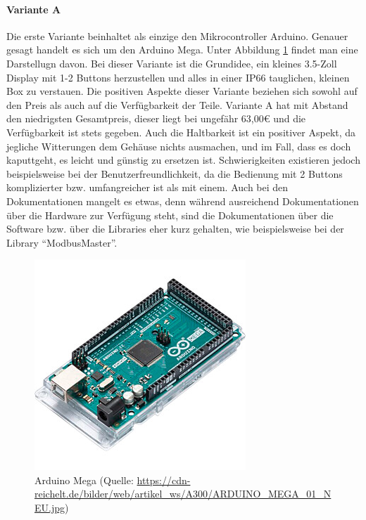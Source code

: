 \paragraph{Variante A}
Die erste Variante beinhaltet als einzige den Mikrocontroller Arduino. Genauer gesagt handelt es sich um den Arduino Mega. Unter Abbildung \ref{fig:arduino_mega} findet man eine Darstellugn davon. Bei dieser Variante ist die Grundidee, ein kleines 3.5-Zoll Display mit 1-2 Buttons herzustellen und alles in einer IP66 tauglichen, kleinen Box zu verstauen. 
Die positiven Aspekte dieser Variante beziehen sich sowohl auf den Preis als auch auf die Verfügbarkeit der Teile. Variante A hat mit Abstand den niedrigsten Gesamtpreis, dieser liegt bei ungefähr 63,00€ und die Verfügbarkeit ist stets gegeben. Auch die Haltbarkeit ist ein positiver Aspekt, da jegliche Witterungen dem Gehäuse nichts ausmachen, und im Fall, dass es doch kaputtgeht, es leicht und günstig zu ersetzen ist. Schwierigkeiten existieren jedoch beispielsweise bei der Benutzerfreundlichkeit, da die Bedienung mit 2 Buttons komplizierter bzw. umfangreicher ist als mit einem. Auch bei den Dokumentationen mangelt es etwas, denn während ausreichend Dokumentationen über die Hardware zur Verfügung steht, sind die Dokumentationen über die Software bzw. über die Libraries eher kurz gehalten, wie beispielsweise bei der Library \enquote{ModbusMaster}.
\begin{figure}[ht]
	\centering
	\includegraphics[width=0.5\linewidth]{Bilder/ARDUINO_MEGA.jpg}
	\caption{Arduino Mega (Quelle: \url{https://cdn-reichelt.de/bilder/web/artikel_ws/A300/ARDUINO_MEGA_01_NEU.jpg})}
	\label{fig:arduino_mega}
\end{figure}
